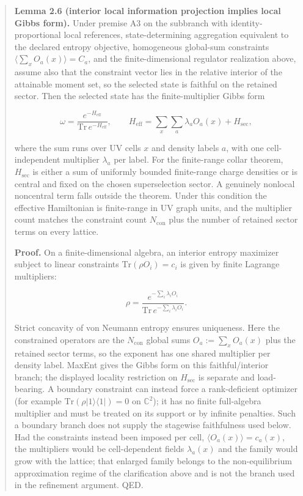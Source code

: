 \begin{quote}
\textbf{Lemma 2.6 (interior local information projection implies local Gibbs form).} Under premise A3 on the subbranch with identity-proportional local references, state-determining aggregation equivalent to the declared entropy objective, homogeneous global-sum constraints \(\langle\sum_x O_a(x)\rangle = C_a\), and the finite-dimensional regulator realization above, assume also that the constraint vector lies in the relative interior of the attainable moment set, so the selected state is faithful on the retained sector. Then the selected state has the finite-multiplier Gibbs form

\[
\omega = \frac{e^{-H_{\mathrm{eff}}}}{\mathrm{Tr}\,e^{-H_{\mathrm{eff}}}},
\qquad
H_{\mathrm{eff}} = \sum_x \sum_a \lambda_a O_a(x) + H_{\mathrm{sec}},
\]

where the sum runs over UV cells \(x\) and density labels \(a\), with one cell-independent multiplier \(\lambda_a\) per label. For the finite-range collar theorem, \(H_{\mathrm{sec}}\) is either a sum of uniformly bounded finite-range charge densities or is central and fixed on the chosen superselection sector. A genuinely nonlocal noncentral term falls outside the theorem. Under this condition the effective Hamiltonian is finite-range in UV graph units, and the multiplier count matches the constraint count \(N_{\mathrm{con}}\) plus the number of retained sector terms on every lattice.

\textbf{Proof.} On a finite-dimensional algebra, an interior entropy maximizer subject to linear constraints \(\mathrm{Tr}(\rho O_i) = c_i\) is given by finite Lagrange multipliers:

\[
\rho = \frac{e^{-\sum_i \lambda_i O_i}}{\mathrm{Tr}\,e^{-\sum_i \lambda_i O_i}}.
\]

Strict concavity of von Neumann entropy ensures uniqueness. Here the constrained operators are the \(N_{\mathrm{con}}\) global sums \(O_a := \sum_x O_a(x)\) plus the retained sector terms, so the exponent has one shared multiplier per density label. MaxEnt gives the Gibbs form on this faithful/interior branch; the displayed locality restriction on \(H_{\mathrm{sec}}\) is separate and load-bearing. A boundary constraint can instead force a rank-deficient optimizer (for example \(\mathrm{Tr}(\rho\lvert1\rangle\!\langle1\rvert)=0\) on \(\mathbb C^2\)); it has no finite full-algebra multiplier and must be treated on its support or by infinite penalties. Such a boundary branch does not supply the stagewise faithfulness used below. Had the constraints instead been imposed per cell, \(\langle O_a(x)\rangle = c_a(x)\), the multipliers would be cell-dependent fields \(\lambda_a(x)\) and the family would grow with the lattice; that enlarged family belongs to the non-equilibrium approximation regime of the clarification above and is not the branch used in the refinement argument. QED.
\end{quote}

